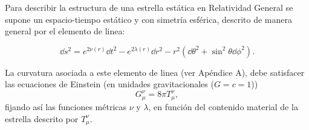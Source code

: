 
Para describir la estructura de una estrella estática en Relatividad General se supone un espacio-tiempo estático y con simetría esférica, descrito de manera general por el elemento de linea:

\begin{equation}
\dd{s}^ { 2 } = e ^ { 2 \nu ( r ) } \dd{ t} ^ { 2 } - e ^ { 2 \lambda ( r ) } \dd{ r} ^ { 2 } - r ^ { 2 } \left( \dd{ \theta} ^ { 2 } + \sin ^ { 2 }  \theta  \dd{ \phi} ^ { 2 } \right) .   
\end{equation}

La curvatura asociada a este elemento de linea (ver Apéndice A), debe satisfacer las ecuaciones de Einstein (en unidades gravitacionales ($G=c=1$))
\begin{equation}
    G _ { \mu } ^ { \nu }  = 8 \pi T _ { \mu } ^ { \nu },
\end{equation}
fijando así las funciones métricas $\nu$ y $\lambda$, en función del contenido material de la estrella descrito por $T _ { \mu } ^ { \nu }$.

